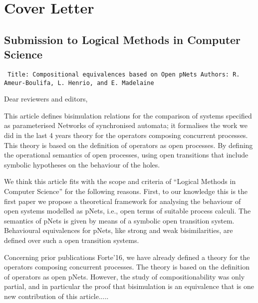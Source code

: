 \documentclass[10pt]{article}
\newenvironment{ttbox}{\begin{alltt}\small\tt}%
                      {\end{alltt}}
\begin{document}
\section*{Cover Letter }
\subsection*{Submission to Logical Methods in Computer Science}
\medskip
\begin{ttbox}
Title: Compositional equivalences based on Open pNets
Authors: R. Ameur-Boulifa, L. Henrio, and E. Madelaine
\end{ttbox}
\bigskip
Dear reviewers and editors,

\medskip
This article defines bisimulation relations  for the comparison of systems specified as parameterised Networks of synchronised automata; it formalises the work we did in the last 4 years theory for the operators composing concurrent processes. This theory is based on the definition of operators as open processes. By defining the operational semantics of open processes, using open transitions that include symbolic hypotheses on the behaviour of the holes.



\smallskip

We think this article fits with the scope and criteria of ``Logical Methods in Computer Science'' for the following reasons. First, to our knowledge this is the first paper we propose a theoretical framework for analysing the behaviour of open systems modelled as pNets, i.e., open terms of suitable process calculi.
The  semantics of pNets is given by means of a symbolic open transition system. Behavioural equivalences for pNets, like strong and weak bisimilarities, are defined over such a open transition systems.



\smallskip

Concerning prior publications Forte'16, we have already defined a theory for the operators composing concurrent processes. The theory is based on the definition of operators as open pNets. However, the study of compositionability was only partial, and in particular the proof that bisimulation is an equivalence that is one new contribution of this article.....
\end{document}
